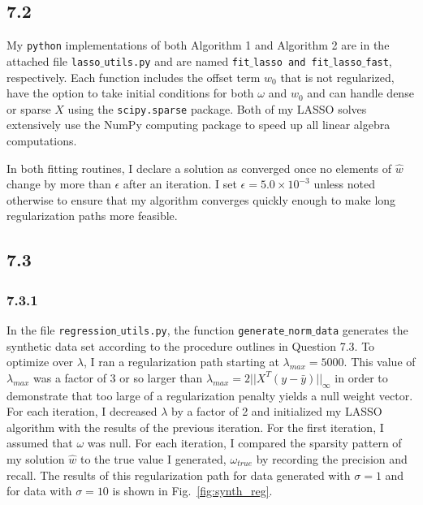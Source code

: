 \documentclass[12pt]{amsart}
\begin{document}
\subsection*{7.2}

My {\tt python} implementations of both Algorithm 1 and Algorithm 2 are in the attached file {\tt lasso$\_$utils.py} and are named {\tt fit$\_$lasso and fit$\_$lasso$\_$fast}, respectively.  Each function includes the offset term $w_0$ that is not regularized, have the option to take initial conditions for both $\omega$ and $w_0$ and can handle dense or sparse $X$ using the {\tt scipy.sparse} package.  Both of my LASSO solves extensively use the NumPy computing package to speed up all linear algebra computations.  

In both fitting routines, I declare a solution as converged once no elements of $\hat{w}$ change by more than $\epsilon$ after an iteration.  I set $\epsilon = 5.0 \times 10^{-3}$ unless noted otherwise to ensure that my algorithm converges quickly enough to make long regularization paths more feasible.  

\subsection*{7.3}

\subsubsection*{7.3.1}

In the file {\tt regression$\_$utils.py}, the function {\tt generate$\_$norm$\_$data} generates the synthetic data set according to the procedure outlines in Question 7.3.  To optimize over $\lambda$, I ran a regularization path starting at $\lambda_{max} = 5000$.  This value of  $\lambda_{max}$ was a factor of 3 or so larger than $\lambda_{max} = 2 ||X^{T}(y - \bar{y}) ||_{\infty}$ in order to demonstrate that too large of a regularization penalty yields a null weight vector.  For each iteration, I decreased $\lambda$ by a factor of 2 and initialized my LASSO algorithm with the results of the previous iteration.  For the first iteration, I assumed that $\omega$ was null.  For each iteration, I compared the sparsity pattern of my solution $\hat{w}$ to the true value I generated, $\omega_{true}$ by recording the precision and recall. The results of this regularization path for data generated with $\sigma = 1$ and for data with $\sigma = 10$ is shown in Fig.~\ref{fig:synth_reg}.
\end{document}
